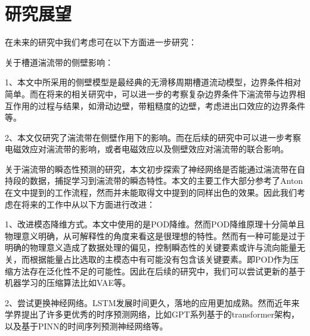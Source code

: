 \section{研究展望}
在未来的研究中我们考虑可在以下方面进一步研究：

关于槽道湍流带的侧壁影响：

1、本文中所采用的侧壁模型是最经典的无滑移周期槽道流动模型，边界条件相对简单。而在将来的相关研究中，可以进一步的考察复杂边界条件下湍流带与边界相互作用的过程与结果，如滑动边壁，带粗糙度的边壁，考虑进出口效应的边界条件等。

2、本文仅研究了湍流带在侧壁作用下的影响。而在后续的研究中可以进一步考察电磁效应对湍流带的影响，或者电磁效应以及侧壁效应对湍流带的联合影响。

关于湍流带的瞬态性预测的研究，本文初步探索了神经网络是否能通过湍流带在自持段的数据，捕捉学习到湍流带的瞬态特性。本文的主要工作大部分参考了Anton在文中提到的工作流程，然而并未能取得文中提到的同样出色的效果。因此我们考虑在将来的工作中从以下方面进行改进：

1、改进模态降维方式。本文中使用的是POD降维。然而POD降维原理十分简单且物理意义明确，从可解释性的角度来看这是很理想的特性。然而有一种可能是过于明确的物理意义造成了数据处理的偏见，控制瞬态性的关键要素或许与流向能量无关，而根据能量占比选取的主模态中有可能没有包含该关键要素。即POD作为压缩方法存在泛化性不足的可能性。因此在后续的研究中，我们可以尝试更新的基于机器学习的压缩算法比如VAE等。

2、尝试更换神经网络。LSTM发展时间更久，落地的应用更加成熟。然而近年来学界提出了许多更优秀的时序预测网络，比如GPT系列基于的transformer架构，以及基于PINN的时间序列预测神经网络等。